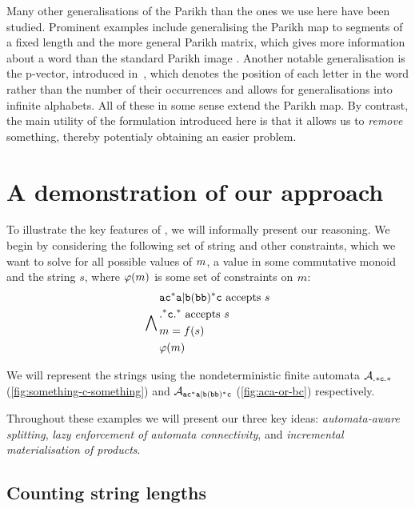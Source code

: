 \documentclass[acmsmall,review,anonymous,screen]{acmart}\settopmatter{printfolios=true,printccs=false,printacmref=true}
\theoremstyle{definition}
\begin{document}
Many other generalisations of the Parikh than the ones we use here have been
studied. Prominent examples include generalising the Parikh map to segments of a
fixed length \cite{KARHUMAKI1980155} and the more general Parikh matrix, which
gives more information about a word than the standard Parikh image
\cite{parikh-matrix}. Another notable generalisation is the p-vector, introduced
in~\cite{infinite-words}, which denotes the position of each letter in the word
rather than the number of their occurrences and allows for generalisations into
infinite alphabets. All of these in some sense extend the Parikh map. By
contrast, the main utility of the formulation introduced here is that it allows
us to \emph{remove} something, thereby potentialy obtaining an easier problem.

\section{A demonstration of our approach}\label{sec:motivation}

To illustrate the key features of \Calculus, we will informally present our
reasoning. We begin by considering the following set of string and other
constraints, which we want to solve for all possible values of $m$,
a value in some commutative monoid and the string $s$, where
$\varphi(m)$ is some set of constraints on $m$:
\begin{equation*}
  \bigwedge\limits_{} \begin{aligned}
  & \mathtt{ac^*a|b(bb)^*c} \text{ accepts } s\\
  & \mathtt{.^*c.^*} \text{ accepts } s \\
  & m = f(s) \\
  & \varphi(m)
  \end{aligned}
 \end{equation*}

We will represent the strings using the nondeterministic finite automata
 $\mathcal{A}_{\mathtt{.*c.*}}{}$ (\cref{fig:something-c-something}) and $\mathcal{A}_{\mathtt{ac^*a|b(bb)^*c}}{}$
 (\cref{fig:aca-or-bc}) respectively.

 Throughout these examples we will present our three key ideas:
 \emph{automata-aware splitting}, \emph{lazy enforcement of automata
 connectivity}, and \emph{incremental materialisation of products}.
 
\subsection{Counting string lengths}
\end{document}
